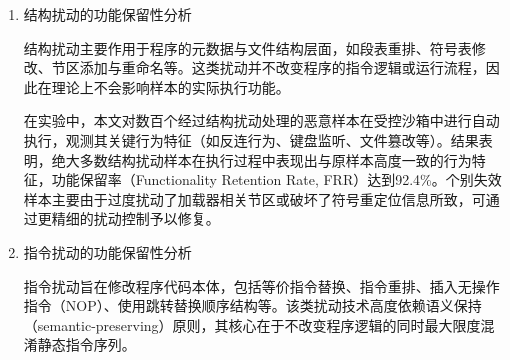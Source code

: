\begin{enumerate}

\item 结构扰动的功能保留性分析


结构扰动主要作用于程序的元数据与文件结构层面，如段表重排、符号表修改、节区添加与重命名等。这类扰动并不改变程序的指令逻辑或运行流程，因此在理论上不会影响样本的实际执行功能。


在实验中，本文对数百个经过结构扰动处理的恶意样本在受控沙箱中进行自动执行，观测其关键行为特征（如反连行为、键盘监听、文件篡改等）。结果表明，绝大多数结构扰动样本在执行过程中表现出与原样本高度一致的行为特征，功能保留率（Functionality Retention Rate, FRR）达到92.4\%。个别失效样本主要由于过度扰动了加载器相关节区或破坏了符号重定位信息所致，可通过更精细的扰动控制予以修复。


\item 指令扰动的功能保留性分析


指令扰动旨在修改程序代码本体，包括等价指令替换、指令重排、插入无操作指令（NOP）、使用跳转替换顺序结构等。该类扰动技术高度依赖语义保持（semantic-preserving）原则，其核心在于不改变程序逻辑的同时最大限度混淆静态指令序列。



\end{enumerate}
